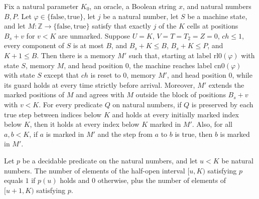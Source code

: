 \begin{theorem}
\label{Complexity.LogProg.ExpBFS.rounds_run}
\leanok
{}
Fix a natural parameter $K_0$, an oracle, a Boolean string $x$, and natural numbers
$B,P$. Let $\varphi\in\{\mathrm{false},\mathrm{true}\}$, let $j$ be a natural number,
let $S$ be a machine state, and let $M:\mathbb{Z}\to\{\mathrm{false},\mathrm{true}\}$
satisfy that exactly $j$ of the $K$ cells at positions $B_s+v$ for $v<K$ are unmarked.
Suppose $U=K$, $V=T=T_2=Z=0$, $ch\leq 1$, every component of $S$ is at most $B$, and
$B_s+K\leq B$, $B_s+K\leq P$, and $K+1\leq B$. Then there is a memory $M'$ such that,
starting at label $\mathrm{rl0}(\varphi)$ with state $S$, memory $M$, and head position
$0$, the machine reaches label $\mathrm{cn0}(\varphi)$ with state $S$ except that $ch$
is reset to $0$, memory $M'$, and head position $0$, while its guard holds at every time
strictly before arrival. Moreover, $M'$ extends the marked positions of $M$ and agrees
with $M$ outside the block of positions $B_s+v$ with $v<K$. For every predicate $Q$ on
natural numbers, if $Q$ is preserved by each true step between indices below $K$ and
holds at every initially marked index below $K$, then it holds at every index below $K$
marked in $M'$. Also, for all $a,b<K$, if $a$ is marked in $M'$ and the step from $a$ to
$b$ is true, then $b$ is marked in $M'$.
\end{theorem}

\begin{lemma}
\label{Complexity.LogProg.ExpBFS.card_filter_Ico_succ}
\leanok
{}
Let $p$ be a decidable predicate on the natural numbers, and let $u<K$ be natural
numbers. The number of elements of the half-open interval $[u,K)$ satisfying $p$ equals
$1$ if $p(u)$ holds and $0$ otherwise, plus the number of elements of $[u+1,K)$
satisfying $p$.
\end{lemma}

